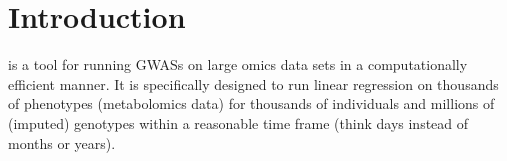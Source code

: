 \chapter{Introduction}
\oanomm is a tool for running \acp{GWAS} on large omics data sets in a
computationally efficient manner. It is specifically designed to run
linear regression on thousands of phenotypes (\eg metabolomics data)
for thousands of individuals and millions of (imputed) genotypes
within a reasonable time frame (think days instead of months or
years).


